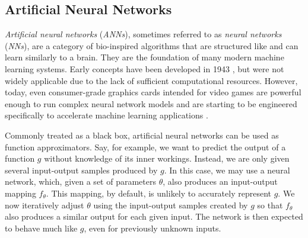 \subsection{Artificial Neural Networks}
\textit{Artificial neural networks} (\textit{ANNs}), sometimes referred to as \textit{neural networks} (\textit{NNs}), are a category of bio-inspired algorithms that are structured like and can learn similarly to a brain. They are the foundation of many modern machine learning systems. Early concepts have been developed in 1943 \cite{first-neuron}, but were not widely applicable due to the lack of sufficient computational resources. However, today, even consumer-grade graphics cards intended for video games are powerful enough to run complex neural network models and are starting to be engineered specifically to accelerate machine learning applications \cite{tensor-cores}.

Commonly treated as a black box, artificial neural networks can be used as function approximators. Say, for example, we want to predict the output of a function $g$ without knowledge of its inner workings. Instead, we are only given several input-output samples produced by $g$. In this case, we may use a neural network, which, given a set of parameters $\theta$, also produces an input-output mapping $f_\theta$. This mapping, by default, is unlikely to accurately represent $g$. We now iteratively adjust $\theta$ using the input-output samples created by $g$ so that $f_\theta$ also produces a similar output for each given input. The network is then expected to behave much like $g$, even for previously unknown inputs.

